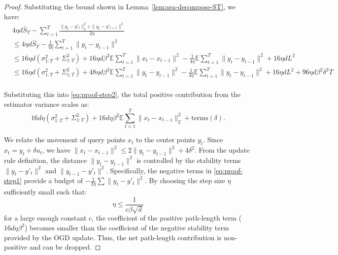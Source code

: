 \documentclass[journal,onecolumn]{IEEEtran}
\theoremstyle{plain}
\theoremstyle{definition}
\theoremstyle{remark}
\begin{document}
{\begin{proof}
    Substituting the bound shown in Lemma~\ref{lem:sea-decompose-ST}, we have:
    \begin{align*}
         & 4\eta d \bar S_{T}-\sum_{t=1}^{T}\frac{\|y_{t} - y'_{t}\|_{2}^{2} + \|y_{t} - y'_{t+1}\|^{2}}{2\eta}                                                                                                                                       \\
         & \leq 4\eta d \bar S_{T}- \frac{1}{4\eta}\sum_{t=1}^{T} \|y_{t} - y_{t-1}\|^{2}                                                                                                                                                             \\
         & \leq 16 \eta d (\sigma_{1:T}^{2} + \Sigma_{1:T}^{2}) + 16 \eta d \beta^{2} \mathbb{E}\sum_{t=1}^{T} \|x_{t} - x_{t-1}\|^{2} - \frac{1}{4\eta}\mathbb{E}\sum_{t=1}^{T} \|y_{t} - y_{t-1}\|^{2}+16\eta dL^{2}                                \\
         & \leq 16 \eta d (\sigma_{1:T}^{2} + \Sigma_{1:T}^{2}) + 48 \eta d \beta^{2} \mathbb{E}\sum_{t=1}^{T} \|y_{t} - y_{t-1}\|^{2} - \frac{1}{4\eta}\mathbb{E}\sum_{t=1}^{T} \|y_{t} - y_{t-1}\|^{2}+16\eta dL^{2}+96\eta d\beta^{2} \delta^{2} T \\
    \end{align*}

    Substituting this into \eqref{eq:proof-step2}, the total positive contribution
    from the estimator variance scales as:
    \begin{equation*}
        16 d \eta (\sigma_{1:T}^{2} + \Sigma_{1:T}^{2}) + 16 d \eta \beta^{2} \mathbb{E}
        \sum_{t=1}^{T} \|x_{t} - x_{t-1}\|_{2}^{2} + \text{terms}(\delta).
    \end{equation*}

    We relate the movement of query points $x_{t}$ to the center points $y_{t}$.
    Since $x_{t} = y_{t} + \delta u_{t}$, we have $\|x_{t} - x_{t-1}\|^{2} \le 2\|
    y_{t} - y_{t-1}\|^{2} + 4\delta^{2}$. From the update rule definition, the distance
    $\|y_{t} - y_{t-1}\|^{2}$ is controlled by the stability terms $\|y_{t} - y'_{t}
    \|^{2}$ and $\|y_{t-1}- y'_{t}\|^{2}$. Specifically, the negative terms in \eqref{eq:proof-step1}
    provide a budget of $-\frac{1}{2\eta}\sum \|y_{t} - y'_{t}\|^{2}$. By choosing
    the step size $\eta$ sufficiently small such that:
    \begin{equation*}
        \eta \le \frac{1}{c \beta \sqrt{d}}
    \end{equation*}
    for a large enough constant $c$, the coefficient of the positive path-length
    term ($16 d \eta \beta^{2}$) becomes smaller than the coefficient of the negative
    stability term provided by the OGD update. Thus, the net path-length contribution
    is non-positive and can be dropped.


\end{proof}}
\end{document}
